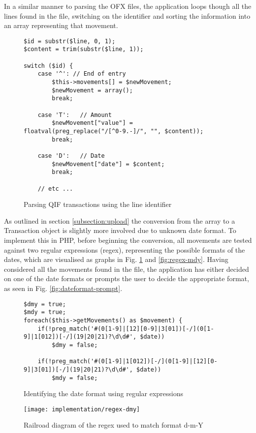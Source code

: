 In a similar manner to parsing the OFX files, the application loops though all the lines found in the file, switching on the identifier and sorting the information into an array representing that movement. 

\begin{figure}
\lstset{style=phpcolor}
\begin{lstlisting}
$id = substr($line, 0, 1);
$content = trim(substr($line, 1));

switch ($id) {
	case '^': // End of entry
		$this->movements[] = $newMovement;
		$newMovement = array();
		break;
		
	case 'T': 	// Amount
		$newMovement["value"] = floatval(preg_replace("/[^0-9.-]/", "", $content));
		break;
		
	case 'D': 	// Date
		$newMovement["date"] = $content;
		break;
		
	// etc ...
\end{lstlisting}
\caption{Parsing QIF transactions using the line identifier}
\end{figure}

As outlined in section \ref{subsection:upload} the conversion from the array to a Transaction object is slightly more involved due to unknown date format. To implement this in PHP, before beginning the conversion, all movements are tested against two regular expressions (regex), representing the possible formats of the dates, which are visualised as graphs in Fig. \ref{fig:regex-dmy} and \ref{fig:regex-mdy}. 
%
Having considered all the movements found in the file, the application has either decided on one of the date formats or prompts the user to decide the appropriate format, as seen in Fig. \ref{fig:dateformat-prompt}.

\begin{figure}
\lstset{style=phpcolor}
\begin{lstlisting}
$dmy = true;
$mdy = true;
foreach($this->getMovements() as $movement) {
	if(!preg_match('#(0[1-9]|[12][0-9]|3[01])[-/](0[1-9]|1[012])[-/](19|20|21)?\d\d#', $date))
		$dmy = false;
	
	if(!preg_match('#(0[1-9]|1[012])[-/](0[1-9]|[12][0-9]|3[01])[-/](19|20|21)?\d\d#', $date))
		$mdy = false;
\end{lstlisting}
\caption{Identifying the date format using regular expressions}
\end{figure}

\begin{figure}[h]
    \centering
    \texttt{[image: implementation/regex-dmy]}
    \caption[Regular expression used to match d-m-Y]{Railroad diagram of the regex used to match format d-m-Y}
    \label{fig:regex-dmy}
\end{figure}

